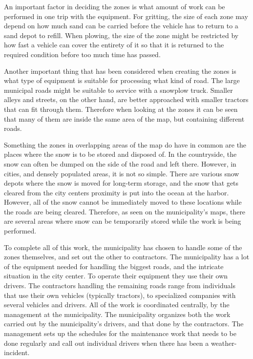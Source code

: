 An important factor in deciding the zones is what amount of work can be performed in one trip with the equipment. For gritting, the size of each zone may depend on how much sand can be carried before the vehicle has to return to a sand depot to refill. When plowing, the size of the zone might be restricted by how fast a vehicle can cover the entirety of it so that it is returned to the required condition before too much time has passed.

Another important thing that has been considered when creating the zones is what type of equipment is suitable for processing what kind of road. The large municipal roads might be suitable to service with a snowplow truck. Smaller alleys and streets, on the other hand, are better approached with smaller tractors that can fit through them. Therefore when looking at the zones it can be seen that many of them are inside the same area of the map, but containing different roads.

Something the zones in overlapping areas of the map do have in common are the places where the snow is to be stored and disposed of. In the countryside, the snow can often be dumped on the side of the road and left there. However, in cities, and densely populated areas, it is not so simple. There are various snow depots where the snow is moved for long-term storage, and the snow that gets cleared from the city centers proximity is put into the ocean at the harbor. However, all of the snow cannot be immediately moved to these locations while the roads are being cleared. Therefore, as seen on the municipality's maps, there are several areas where snow can be temporarily stored while the work is being performed.

To complete all of this work, the municipality has chosen to handle some of the zones themselves, and set out the other to contractors. The municipality has a lot of the equipment needed for handling the biggest roads, and the intricate situation in the city center. To operate their equipment they use their own drivers. The contractors handling the remaining roads range from individuals that use their own vehicles (typically tractors), to specialized companies with several vehicles and drivers. All of the work is coordinated centrally, by the management at the municipality. The municipality organizes both the work carried out by the municipality's drivers, and that done by the contractors. The management sets up the schedules for the maintenance work that needs to be done regularly and call out individual drivers when there has been a weather-incident.

